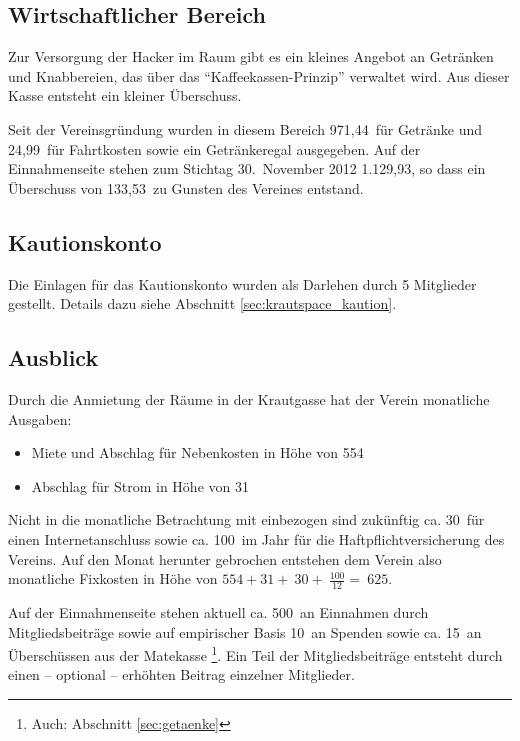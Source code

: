 \documentclass[10pt,DIV16]{scrartcl}
\begin{document}
\subsection{Wirtschaftlicher Bereich}

Zur Versorgung der Hacker im Raum gibt es ein kleines Angebot an 
Getränken und Knabbereien, das über das "`Kaffeekassen-Prinzip"'
verwaltet wird. Aus dieser Kasse entsteht ein kleiner Überschuss. 

Seit der Vereinsgründung wurden in diesem Bereich 971,44\EUR\ für 
Getränke und 24,99\EUR\ für Fahrtkosten sowie ein Getränkeregal
ausgegeben. Auf der Einnahmenseite stehen zum Stichtag 30.~November 
2012 1.129,93\EUR, so dass ein Überschuss von 133,53\EUR\ zu Gunsten 
des Vereines entstand. 

\subsection{Kautionskonto}

Die Einlagen für das Kautionskonto wurden als Darlehen durch 5 
Mitglieder gestellt. Details dazu siehe Abschnitt 
\ref{sec:krautspace_kaution}.

\subsection{Ausblick} 

Durch die Anmietung der Räume in der Krautgasse hat der Verein 
monatliche Ausgaben: 

\begin{itemize}
	\item Miete und Abschlag für Nebenkosten in Höhe von 554\EUR{}
	\item Abschlag für Strom in Höhe von 31\EUR{}
\end{itemize}

Nicht in die monatliche Betrachtung mit einbezogen sind zukünftig 
ca. 30\EUR\ für einen Internetanschluss sowie ca. 100\EUR\ im Jahr 
für die Haftpflichtversicherung des Vereins. Auf den Monat herunter 
gebrochen entstehen dem Verein also monatliche Fixkosten in Höhe von 
$554 + 31 + ~30+ ~\frac{100}{12} = ~625$\EUR. 

Auf der Einnahmenseite stehen aktuell ca. 500\EUR\ an Einnahmen 
durch Mitgliedsbeiträge sowie auf empirischer Basis 10\EUR\ an
Spenden sowie ca. 15\EUR\ an Überschüssen aus der Matekasse
\footnote{Auch: Abschnitt \ref{sec:getaenke}}. Ein Teil der 
Mitgliedsbeiträge entsteht durch einen -- optional -- erhöhten 
Beitrag einzelner Mitglieder. 
\end{document}
